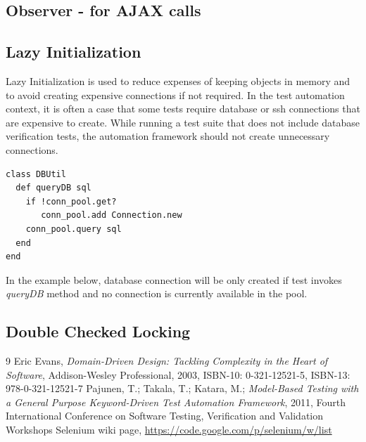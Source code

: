 \documentclass[12pt,twoside]{article}
\begin{document}
\subsection{Observer - for AJAX calls}

\subsection{Lazy Initialization}
Lazy Initialization is used to reduce expenses of keeping objects in memory and to avoid creating expensive connections if not required. In the test automation context, it is often a case that some tests require database or ssh connections that are expensive to create. While running a test suite that does not include database verification tests, the automation framework should not create unnecessary connections. 
\begin{verbatim}
class DBUtil
  def queryDB sql
    if !conn_pool.get?
       conn_pool.add Connection.new
    conn_pool.query sql
  end
end
\end{verbatim}
In the example below, database connection will be only created if test invokes \emph{queryDB} method and no connection is currently available in the pool.

\subsection{Double Checked Locking}




\begin{thebibliography} {9}
 Eric Evans, {\sl Domain-Driven Design: Tackling Complexity in the Heart of Software}, Addison-Wesley Professional, 2003, ISBN-10: 0-321-12521-5, ISBN-13: 978-0-321-12521-7
 Pajunen, T.; Takala, T.; Katara, M.; {\sl Model-Based Testing with a General Purpose Keyword-Driven Test Automation Framework}, 2011, Fourth International Conference on Software Testing, Verification and Validation Workshops
 Selenium wiki page, \url{https://code.google.com/p/selenium/w/list}
\end{thebibliography}
\end{document}
